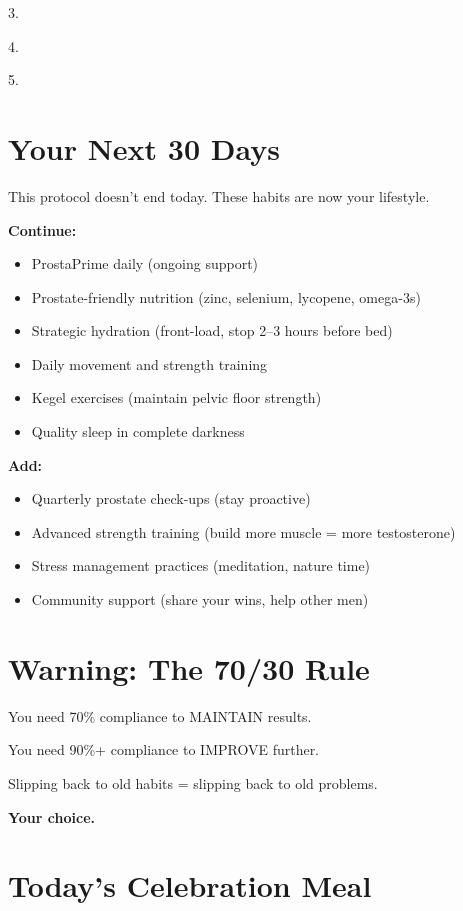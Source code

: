 \documentclass[11pt,oneside]{book}
\begin{document}
3. \underline{\hspace{10cm}}

4. \underline{\hspace{10cm}}

5. \underline{\hspace{10cm}}

\section*{Your Next 30 Days}

This protocol doesn't end today. These habits are now your lifestyle.

\textbf{Continue:}
\begin{itemize}[leftmargin=*]
\item ProstaPrime daily (ongoing support)
\item Prostate-friendly nutrition (zinc, selenium, lycopene, omega-3s)
\item Strategic hydration (front-load, stop 2--3 hours before bed)
\item Daily movement and strength training
\item Kegel exercises (maintain pelvic floor strength)
\item Quality sleep in complete darkness
\end{itemize}

\textbf{Add:}
\begin{itemize}[leftmargin=*]
\item Quarterly prostate check-ups (stay proactive)
\item Advanced strength training (build more muscle = more testosterone)
\item Stress management practices (meditation, nature time)
\item Community support (share your wins, help other men)
\end{itemize}

\section*{Warning: The 70/30 Rule}

You need 70\% compliance to MAINTAIN results.

You need 90\%+ compliance to IMPROVE further.

Slipping back to old habits = slipping back to old problems.

\textbf{Your choice.}

\section*{Today's Celebration Meal}
\end{document}
